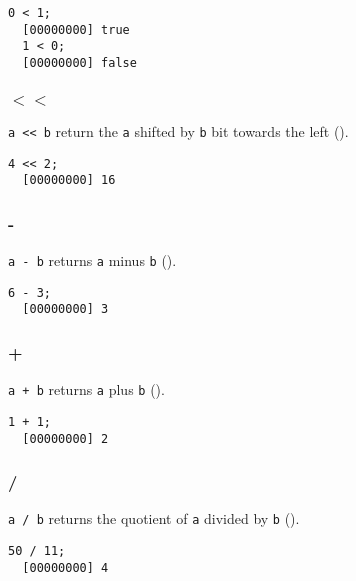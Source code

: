 \begin{lstlisting}[caption=Float.'$<$', label=lst:float-inf,
  float=\floatposh]
  0 < 1;
  [00000000] true
  1 < 0;
  [00000000] false
\end{lstlisting}

\subsubsection{$<<$}

\lstinline|a << b| return the \lstinline|a| shifted by \lstinline|b|
bit towards the left ().

\begin{lstlisting}[caption=Float.'$<<$', label=lst:float-lshift,
  float=\floatposh]
  4 << 2;
  [00000000] 16
\end{lstlisting}

\subsubsection{-}

\lstinline|a - b| returns \lstinline|a| minus \lstinline|b| ().

\begin{lstlisting}[caption=Float.'-', label=lst:float-minus,
  float=\floatposh]
  6 - 3;
  [00000000] 3
\end{lstlisting}

\subsubsection{+}

\lstinline|a + b| returns \lstinline|a| plus \lstinline|b| ().

\begin{lstlisting}[caption=Float.'+', label=lst:float-plus, float=\floatposh]
  1 + 1;
  [00000000] 2
\end{lstlisting}

\subsubsection{/}

\lstinline|a / b| returns the quotient of \lstinline|a| divided by
\lstinline|b| ().

\begin{lstlisting}[caption=Float.'/', label=lst:float-div, float=\floatposh]
  50 / 11;
  [00000000] 4
\end{lstlisting}

